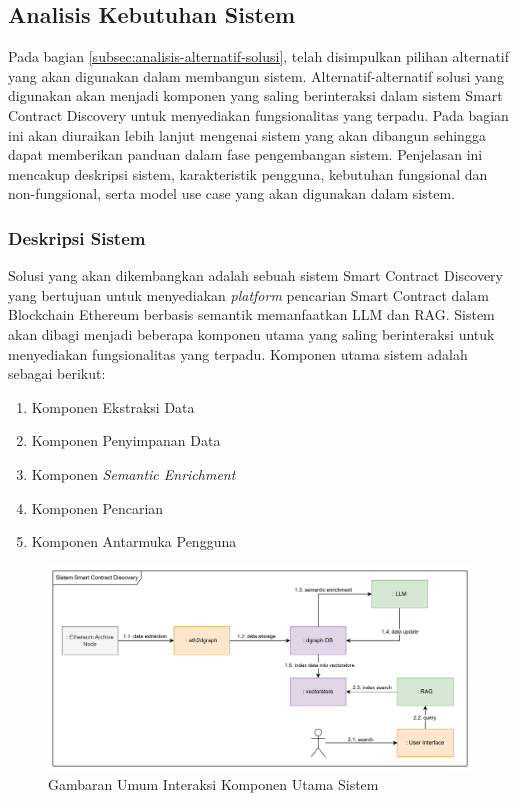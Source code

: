 \subsection{Analisis Kebutuhan Sistem}

Pada bagian \ref{subsec:analisis-alternatif-solusi}, telah disimpulkan pilihan alternatif yang akan digunakan dalam membangun sistem. Alternatif-alternatif solusi yang digunakan akan menjadi komponen yang saling berinteraksi dalam sistem Smart Contract Discovery untuk menyediakan fungsionalitas yang terpadu. Pada bagian ini akan diuraikan lebih lanjut mengenai sistem yang akan dibangun sehingga dapat memberikan panduan dalam fase pengembangan sistem. Penjelasan ini mencakup deskripsi sistem, karakteristik pengguna, kebutuhan fungsional dan non-fungsional, serta model use case yang akan digunakan dalam sistem.

\subsubsection{Deskripsi Sistem}

Solusi yang akan dikembangkan adalah sebuah sistem Smart Contract Discovery yang bertujuan untuk menyediakan \textit{platform} pencarian Smart Contract dalam Blockchain Ethereum berbasis semantik memanfaatkan LLM dan RAG. Sistem akan dibagi menjadi beberapa komponen utama yang saling berinteraksi untuk menyediakan fungsionalitas yang terpadu. Komponen utama sistem adalah sebagai berikut:

\begin{enumerate}
  \item Komponen Ekstraksi Data
  \item Komponen Penyimpanan Data
  \item Komponen \textit{Semantic Enrichment}
  \item Komponen Pencarian
  \item Komponen Antarmuka Pengguna
\end{enumerate}

\begin{figure}[ht]
	\centering
	\includegraphics[width=1\textwidth]{resources/chapter-3/komponen-utama.png}
	\caption{Gambaran Umum Interaksi Komponen Utama Sistem}
	\label{image:komponen-sistem}
\end{figure}

